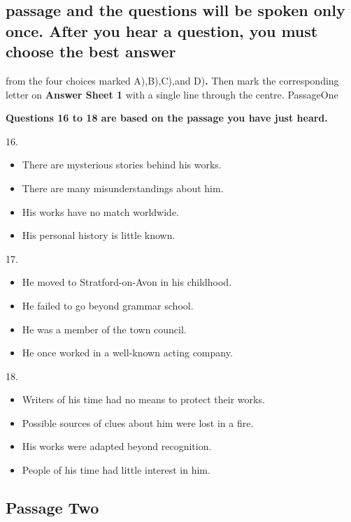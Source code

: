 \documentclass[UTF8,11pt]{ctexart}
\begin{document}
\subsection*{passage and the questions will be spoken only once. After you hear a question, you must choose the best answer}


from the four choices marked A),B),C),and D)\textbf{.} Then mark the corresponding letter on\textbf{ Answer Sheet 1} with a single line through the centre. PassageOne


\textbf{Questions 16 to 18 are based on the passage you have just heard.}


16.


\begin{itemize}[leftmargin=2em,itemsep=.2em,topsep=.4em]\item[A.] There are mysterious stories behind his works.
\item[B.] There are many misunderstandings about him.
\item[C.] His works have no match worldwide.
\item[D.] His personal history is little known.
\end{itemize}

17.


\begin{itemize}[leftmargin=2em,itemsep=.2em,topsep=.4em]\item[A.] He moved to Stratford-on-Avon in his childhood.
\item[B.] He failed to go beyond grammar school.
\item[C.] He was a member of the town council.
\item[D.] He once worked in a well-known acting company.
\end{itemize}

18.


\begin{itemize}[leftmargin=2em,itemsep=.2em,topsep=.4em]\item[A.] Writers of his time had no means to protect their works.
\item[B.] Possible sources of clues about him were lost in a fire.
\item[C.] His works were adapted beyond recognition.
\item[D.] People of his time had little interest in him.
\end{itemize}

\subsection*{Passage Two}
\end{document}
